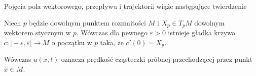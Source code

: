 Pojęcia pola wektorowego, przepływu i trajektorii wiąże następujące twierdzenie

\begin{twierdzenie}
    Niech \(p\) będzie dowolnym punktem rozmaitości \(M\) i \(X_p\in T_p M\) dowolnym wektorem stycznym w \(p\). Wówczas dla pewnego \(\varepsilon > 0\) istnieje gładka krzywa \(c: ]-\varepsilon, \varepsilon[ \rightarrow M\) o początku w \(p\) taka, że \(c'(0) = X_p\).
\end{twierdzenie}

Wówczas \(u(x, t)\) oznacza prędkość cząsteczki próbnej przechodzącej przez punkt \(x\in M\). 
